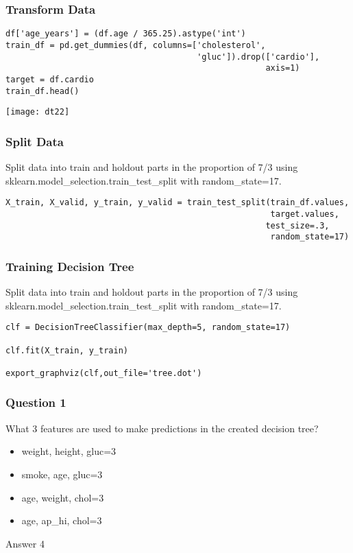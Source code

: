 \begin{frame}[fragile]\frametitle{Transform Data}	
\begin{lstlisting}
df['age_years'] = (df.age / 365.25).astype('int')
train_df = pd.get_dummies(df, columns=['cholesterol', 
                                       'gluc']).drop(['cardio'],
                                                     axis=1)
target = df.cardio
train_df.head()
\end{lstlisting}
\begin{center}
\texttt{[image: dt22]}
\end{center}
\end{frame}

\begin{frame}[fragile]\frametitle{Split Data}	
Split data into train and holdout parts in the proportion of 7/3 using sklearn.model\_selection.train\_test\_split with random\_state=17.
\begin{lstlisting}
X_train, X_valid, y_train, y_valid = train_test_split(train_df.values, 
                                                      target.values,
                                                     test_size=.3, 
                                                      random_state=17)
\end{lstlisting}
\end{frame}

\begin{frame}[fragile]\frametitle{Training Decision Tree}	
Split data into train and holdout parts in the proportion of 7/3 using sklearn.model\_selection.train\_test\_split with random\_state=17.
\begin{lstlisting}
clf = DecisionTreeClassifier(max_depth=5, random_state=17)

clf.fit(X_train, y_train)

export_graphviz(clf,out_file='tree.dot') 
\end{lstlisting}
\end{frame}

\begin{frame}[fragile]\frametitle{Question 1}
What 3 features are used to make predictions in the created decision tree?	
\begin{itemize}
\item weight, height, gluc=3
\item smoke, age, gluc=3
\item age, weight, chol=3
\item age, ap\_hi, chol=3
\end{itemize}
Answer 4
\end{frame}

